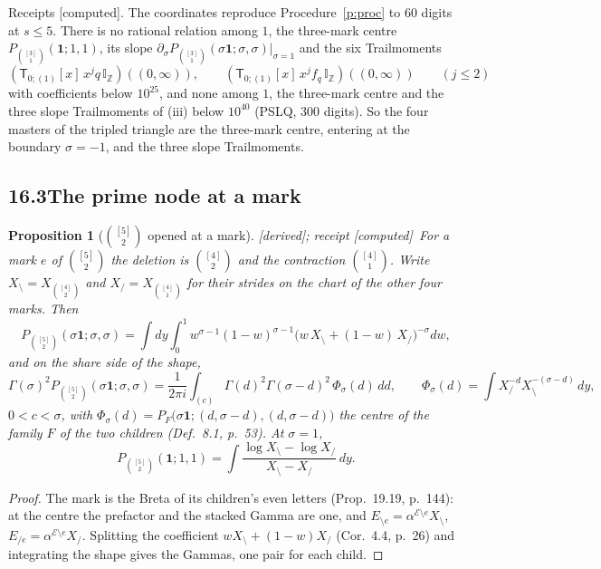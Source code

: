 \documentclass[11pt]{article}
\newcommand{\cE}{\mathcal E}
\newcommand{\one}{\mathbf 1}
\newcommand{\sT}{\mathsf T}
\newcommand{\IZ}{\mathbb I_{\mathbb Z}}
\newcommand{\Tx}[3]{(\sT_{#1;(1)}[x]\,#2)((#3,\infty))}
\theoremstyle{plain}
\newtheorem{proposition}{Proposition}[section]
\theoremstyle{definition}
\theoremstyle{remark}
\newcommand{\derived}{\textup{[derived]}}
\newcommand{\computed}{\textup{[computed]}}
\begin{document}
\noindent Receipts \computed. The coordinates reproduce Procedure~\ref{p:proc} to $60$ digits at $s\le5$. There is no rational relation among $1$, the three-mark centre $P_{\binom{[3]}1}(\one;1,1)$, its slope $\partial_\sigma P_{\binom{[3]}1}(\sigma\one;\sigma,\sigma)|_{\sigma=1}$ and the six Trailmoments
\[
\Tx{0}{x^jq\,\IZ}{0},\qquad \Tx{0}{x^jf_q\,\IZ}{0}\qquad(j\le2)
\]
with coefficients below $10^{25}$, and none among $1$, the three-mark centre and the three slope Trailmoments of (iii) below $10^{40}$ (PSLQ, $300$ digits). So the four masters of the tripled triangle are the three-mark centre, entering at the boundary $\sigma=-1$, and the three slope Trailmoments.

\subsection*{16.3\quad The prime node at a mark}

\begin{proposition}[$\binom{[5]}2$ opened at a mark]\label{p:u25split}\derived; receipt \computed\
For a mark $e$ of $\binom{[5]}2$ the deletion is $\binom{[4]}2$ and the contraction $\binom{[4]}1$. Write $X_{\setminus}=X_{\binom{[4]}2}$ and $X_{/}=X_{\binom{[4]}1}$ for their strides on the chart of the other four marks. Then
\[
P_{\binom{[5]}2}(\sigma\one;\sigma,\sigma)=\int dy\int_0^1w^{\sigma-1}(1-w)^{\sigma-1}\big(w\,X_{\setminus}+(1-w)\,X_{/}\big)^{-\sigma}dw,
\]
and on the share side of the shape,
\[
\Gamma(\sigma)^2P_{\binom{[5]}2}(\sigma\one;\sigma,\sigma)=\frac1{2\pi i}\int_{(c)}\Gamma(d)^2\Gamma(\sigma-d)^2\,\Phi_\sigma(d)\,dd,\qquad \Phi_\sigma(d)=\int X_{/}^{-d}X_{\setminus}^{-(\sigma-d)}\,dy,
\]
$0<c<\sigma$, with $\Phi_\sigma(d)=P_F\big(\sigma\one;(d,\sigma-d),(d,\sigma-d)\big)$ the centre of the family $F$ of the two children (Def.~8.1, p.~53). At $\sigma=1$,
\[
P_{\binom{[5]}2}(\one;1,1)=\int\frac{\log X_{\setminus}-\log X_{/}}{X_{\setminus}-X_{/}}\,dy .
\]
\end{proposition}

\begin{proof}
The mark is the Breta of its children's even letters (Prop.~19.19, p.~144): at the centre the prefactor and the stacked Gamma are one, and $E_{\setminus e}=\alpha^{\cE\setminus e}X_{\setminus}$, $E_{/e}=\alpha^{\cE\setminus e}X_{/}$. Splitting the coefficient $wX_{\setminus}+(1-w)X_{/}$ (Cor.~4.4, p.~26) and integrating the shape gives the Gammas, one pair for each child.
\end{proof}
\end{document}
